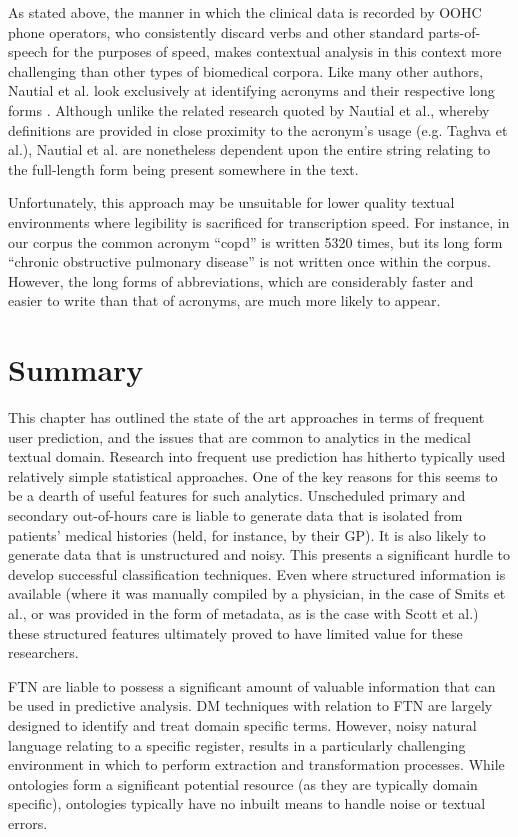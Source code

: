 As stated above, the manner in which the clinical data is recorded by OOHC phone operators, who
consistently discard verbs and other standard parts-of-speech for the purposes of speed, makes
contextual analysis in this context more challenging than other types of biomedical corpora.
Like many other authors, Nautial et al. look exclusively at identifying acronyms and their respective
long forms  \cite{nautial2014finding}. Although unlike the related research quoted by Nautial et al., whereby definitions
are provided in close proximity to the acronym’s usage (e.g. Taghva et al.\cite{taghva2011acronym}), Nautial et al. are nonetheless dependent upon the entire string relating to the full-length form being present somewhere in the text.

Unfortunately, this approach may be unsuitable for lower quality textual environments where legibility is sacrificed for transcription speed. For instance, in our corpus the common acronym “copd” is written 5320 times, but its long form “chronic obstructive pulmonary disease” is not written once within the corpus. However, the long forms of abbreviations, which are considerably faster and easier to write than that of acronyms, are much more likely to appear.


\section{Summary}

This chapter has outlined the state of the art approaches in terms of frequent user prediction, and the issues that are common to analytics in the medical textual domain. Research into frequent use prediction has hitherto typically used relatively simple statistical approaches. One of the key reasons for this seems to be a dearth of useful features for such analytics. Unscheduled primary and secondary out-of-hours care is liable to generate data that is isolated from patients' medical histories (held, for instance, by their GP). It is also likely to generate data that is unstructured and noisy. This presents a significant hurdle to develop successful classification techniques. Even where structured information is available (where it was manually compiled by a physician, in the case of Smits et al., or was provided in the form of metadata, as is the case with Scott et al.) these structured features ultimately proved to have limited value for these researchers.

FTN are liable to possess a significant amount of valuable information that can be used in predictive analysis. DM techniques with relation to FTN are largely designed to identify and treat domain specific terms. However, noisy natural language relating to a specific register, results in a particularly challenging environment in which to perform extraction and transformation processes. While ontologies form a significant potential resource (as they are typically domain specific), ontologies typically have no inbuilt means to handle noise or textual errors.%

